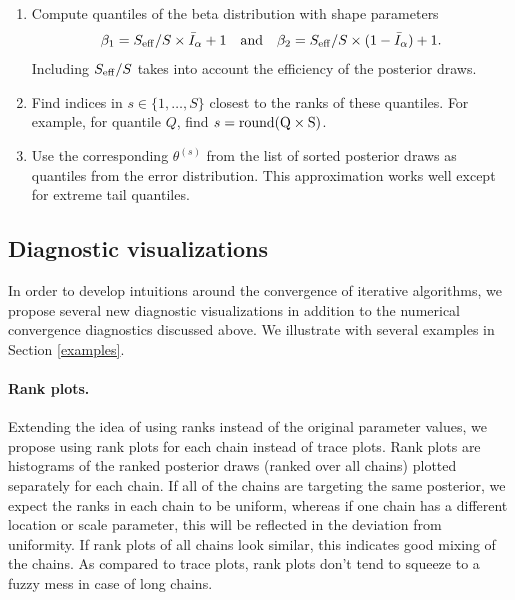 \documentclass[american,]{article}
\let\oldparagraph\paragraph
\renewcommand{\paragraph}[1]{\oldparagraph{#1}\mbox{}}
\theoremstyle{definition}
\begin{document}
\begin{enumerate}
\def\labelenumi{\arabic{enumi}.}
\item
  Compute quantiles of the beta distribution with shape parameters
  \begin{equation}
  \beta_1 = S_{\rm eff} / S \times \bar{I}_\alpha+1 \quad \text{and} \quad
  \beta_2 = S_{\rm eff} / S \times (1-\bar{I}_\alpha) + 1.
  \end{equation} Including \(S_{\rm eff}/S\) takes into account the
  efficiency of the posterior draws.
\item
  Find indices in \(s \in \{1,\ldots,S\}\) closest to the ranks of these
  quantiles. For example, for quantile \(Q\), find
  \(s = {\rm round(Q \times S)}\).
\item
  Use the corresponding \(\theta^{(s)}\) from the list of sorted
  posterior draws as quantiles from the error distribution. This
  approximation works well except for extreme tail quantiles.
\end{enumerate}


\hypertarget{diagnostic-visualizations}{%
\subsection{Diagnostic visualizations}\label{diagnostic-visualizations}}

In order to develop intuitions around the convergence of iterative algorithms, we
propose several new diagnostic visualizations in addition to the numerical
convergence diagnostics discussed above. We illustrate with several examples in Section
\ref{examples}.

\hypertarget{rank-plots}{%
\paragraph{Rank plots.}\label{rank-plots}}
Extending the idea of using ranks instead of the original parameter
values, we propose using rank plots for each chain instead
of trace plots. Rank plots are histograms of the
ranked posterior draws (ranked over all chains) plotted separately for
each chain. If all of the chains are targeting the same posterior, we expect the 
ranks in each chain to be uniform, whereas if one chain has a different location
or scale parameter, this will be reflected in the deviation from uniformity. 
 If rank plots of all chains look similar, this indicates
good mixing of the chains. As compared to trace plots, rank plots don't
tend to squeeze to a fuzzy mess in case of long chains.
\end{document}
